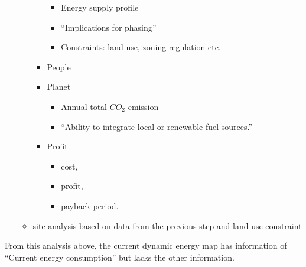\documentclass[hidelinks,12pt]{article}
\begin{document}
\begin{enumerate}[{Step }1]
\begin{itemize}
\begin{itemize}
\begin{itemize}
        \item Energy supply profile
        \item ``Implications for phasing''~\cite{IDEA2012}
        \item Constraints: land use, zoning regulation etc.
        \end{itemize}
      \item People
      \item Planet
        \begin{itemize}
        \item Annual total $CO_2$ emission
        \item ``Ability to integrate local or renewable fuel
          sources.''~\cite{IDEA2012}
        \end{itemize}
      \item Profit
        \begin{itemize}
        \item cost, 
        \item profit,
        \item payback period.
        \end{itemize}
      \end{itemize}
    \item site analysis based on data from the previous step and land
      use constraint
    \end{itemize}
\end{enumerate}

From this analysis above, the current dynamic energy map has
information of ``Current energy consumption'' but lacks the other
information.
\newpage


\end{document}
